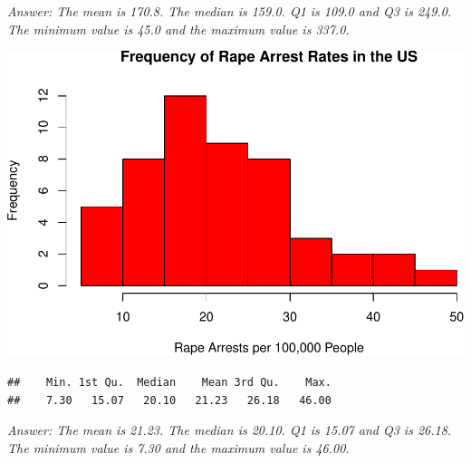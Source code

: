 \documentclass[
]{article}
\newenvironment{Shaded}{\begin{snugshade}}{\end{snugshade}}
\newcommand{\AttributeTok}[1]{\textcolor[rgb]{0.77,0.63,0.00}{#1}}
\newcommand{\FunctionTok}[1]{\textcolor[rgb]{0.00,0.00,0.00}{#1}}
\newcommand{\NormalTok}[1]{#1}
\newcommand{\SpecialCharTok}[1]{\textcolor[rgb]{0.00,0.00,0.00}{#1}}
\newcommand{\StringTok}[1]{\textcolor[rgb]{0.31,0.60,0.02}{#1}}
\begin{document}
\emph{Answer: The mean is 170.8. The median is 159.0. Q1 is 109.0 and Q3
is 249.0. The minimum value is 45.0 and the maximum value is 337.0.}

\begin{Shaded}
\end{Shaded}

\includegraphics{Assignments_files/figure-latex/unnamed-chunk-11-1.pdf}

\begin{Shaded}
\end{Shaded}

\begin{verbatim}
##    Min. 1st Qu.  Median    Mean 3rd Qu.    Max. 
##    7.30   15.07   20.10   21.23   26.18   46.00
\end{verbatim}

\emph{Answer: The mean is 21.23. The median is 20.10. Q1 is 15.07 and Q3
is 26.18. The minimum value is 7.30 and the maximum value is 46.00.}
\end{document}
